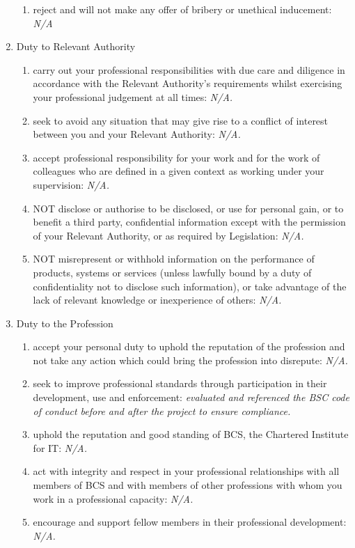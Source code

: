 \begin{enumerate}
\begin{enumerate}
      \item reject and will not make any offer of bribery or unethical inducement: \textit{N/A}
  \end{enumerate}
  \item Duty to Relevant Authority
  \begin{enumerate}
      \item carry out your professional responsibilities with due care and diligence in accordance with the Relevant Authority’s requirements whilst exercising your professional judgement at all times: \textit{N/A.}
      \item seek to avoid any situation that may give rise to a conflict of interest between you and your Relevant Authority: \textit{N/A.}
      \item accept professional responsibility for your work and for the work of colleagues who are defined in a given context as working under your supervision: \textit{N/A.}
      \item NOT disclose or authorise to be disclosed, or use for personal gain, or to benefit a third party, confidential information except with the permission of your Relevant Authority, or as required by Legislation: \textit{N/A.}
      \item NOT misrepresent or withhold information on the performance of products, systems or services (unless lawfully bound by a duty of confidentiality not to disclose such information), or take advantage of the lack of relevant knowledge or inexperience of others: \textit{N/A.}
  \end{enumerate}
  \item Duty to the Profession
  \begin{enumerate}
      \item accept your personal duty to uphold the reputation of the profession and not take any action which could bring the profession into disrepute: \textit{N/A.}
      \item seek to improve professional standards through participation in their development, use and enforcement: \textit{evaluated and referenced the BSC code of conduct before and after the project to ensure compliance.}
      \item uphold the reputation and good standing of BCS, the Chartered Institute for IT: \textit{N/A.}
      \item act with integrity and respect in your professional relationships with all members of BCS and with members of other professions with whom you work in a professional capacity: \textit{N/A.}
      \item encourage and support fellow members in their professional development: \textit{N/A.}
  \end{enumerate}
\end{enumerate}

